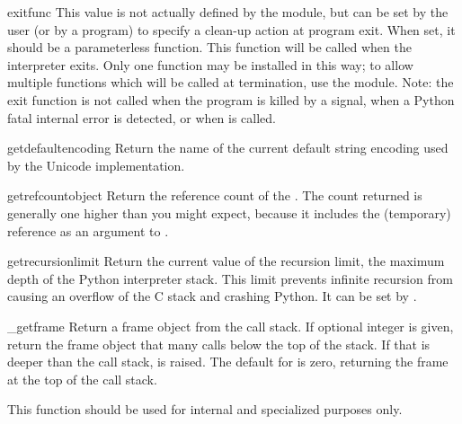 \begin{datadesc}{exitfunc}
  This value is not actually defined by the module, but can be set by
  the user (or by a program) to specify a clean-up action at program
  exit.  When set, it should be a parameterless function.  This function
  will be called when the interpreter exits.  Only one function may be
  installed in this way; to allow multiple functions which will be called
  at termination, use the  module.  Note: the exit function
  is not called when the program is killed by a signal, when a Python
  fatal internal error is detected, or when  is called.
\end{datadesc}

\begin{funcdesc}{getdefaultencoding}{}
  Return the name of the current default string encoding used by the
  Unicode implementation.
\end{funcdesc}

\begin{funcdesc}{getrefcount}{object}
Return the reference count of the .  The count returned is
generally one higher than you might expect, because it includes the
(temporary) reference as an argument to .
\end{funcdesc}

\begin{funcdesc}{getrecursionlimit}{}
Return the current value of the recursion limit, the maximum depth of
the Python interpreter stack.  This limit prevents infinite recursion
from causing an overflow of the C stack and crashing Python.  It can
be set by .
\end{funcdesc}

\begin{funcdesc}{_getframe}{}
Return a frame object from the call stack.  If optional integer
 is given, return the frame object that many calls below
the top of the stack.  If that is deeper than the call stack,
 is raised.  The default for  is
zero, returning the frame at the top of the call stack.

This function should be used for internal and specialized
purposes only.
\end{funcdesc}

